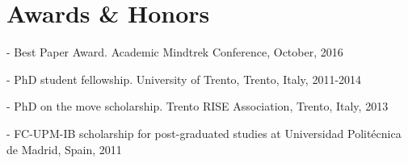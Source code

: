 
\section{Awards \& Honors}

- Best Paper Award. Academic Mindtrek Conference, October, 2016

- PhD student fellowship. University of Trento, Trento, Italy, 2011-2014

- PhD on the move scholarship. Trento RISE Association, Trento, Italy, 2013

- FC-UPM-IB scholarship for post-graduated studies at Universidad Politécnica de Madrid, Spain, 2011
